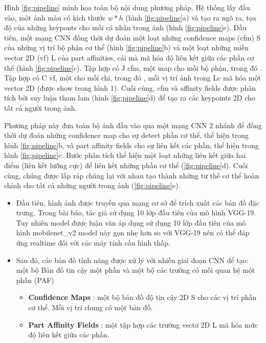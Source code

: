 Hình \ref{fig:pipeline} mình họa toàn bộ nội dung phương pháp. Hệ thống lấy đầu vào, một ảnh màu có kích thước $w*h$ (hình \ref{fig:pipeline}a) và tạo ra ngõ ra, tọa độ của những keyponts cho mỗi cá nhân trong ảnh (hình \ref{fig:pipeline}e). Đầu tiên, một mạng CNN đồng thời dự đoán một loạt những confidence maps (cfm) S của những vị trí bộ phận cơ thể (hình \ref{fig:pipeline}b) và một loạt những miền vector 2D (vf) L của part affinities, cái mà mã hóa độ liên kết giữa các phần cơ thể (hình \ref{fig:pipeline}c). Tập hợp  có J cfm, một map cho mỗi bộ phận, trong đó . Tập hợp  có C vf, một cho mỗi chi, trong đó , mỗi vị trí ảnh trong Lc mã hóa một vector 2D (được show trong hình 1). Cuối cùng, cfm và affinity fields được phân tích bởi suy luận tham lam (hình \ref{fig:pipeline}d) để tạo ra các keypoints 2D cho tất cả người trong ảnh.

Phương pháp này đưa toàn bộ ảnh đầu vào qua một mạng CNN 2 nhánh để đồng thời dự đoán những confidence map cho sự detect phần cơ thể, thể hiện trong hình \ref{fig:pipeline}b, và part affinity fields cho sự liên kết các phần, thể hiện trong hình \ref{fig:pipeline}c. Bước phân tích thể hiện một loạt những liên kết giữa hai điểm (liên kết lưỡng cực) để liên kết những phần cơ thể (\ref{fig:pipeline}d). Cuối cùng, chúng được lắp ráp chúng lại với nhau tạo thành những tư thế cơ thể hoàn chỉnh cho tất cả những người trong ảnh (\ref{fig:pipeline}e).

\begin{itemize} %
\item Đầu tiên, hình ảnh được truyền qua mạng cơ sở để trích xuất các bản đồ đặc trưng. Trong bài báo, tác giả sử dụng 10 lớp đầu tiên của mô hình VGG-19. Tuy nhiên model được luận văn áp dụng sử dụng 10 lớp đầu tiên của mô hình mobilenet\_v2 model này gọn nhẹ hơn so với VGG-19 nên có thể đáp ứng realtime đối với các máy tính cấu hình thấp.
\end{itemize}


\begin{itemize} %
\item Sau đó, các bản đồ tính năng được xử lý với nhiều giai đoạn CNN để tạo: một bộ Bản đồ tin cậy một phần và một bộ các trường có mối quan hệ một phần (PAF)
	\begin{itemize}
	\item \textbf{Confidence Maps} : một bộ bản đồ độ tin cậy 2D S cho các vị trí phần cơ thể. Mỗi vị trí chung có một bản đồ.
	\item \textbf{Part Affinity Fields} : một tập hợp các trường vectơ 2D L mã hóa mức độ liên kết giữa các phần.
	\end{itemize}
\end{itemize}


